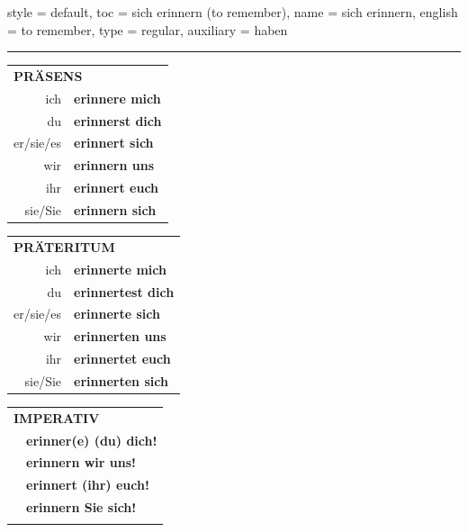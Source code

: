 \begin{verbentry}{
  style = {default},
  toc = {sich erinnern (to remember)},
  name = {sich erinnern},
  english = {to remember},
  type = {regular},
  auxiliary = {haben}
}
 
    
       \vspace{5pt}

    \hrule
    
    \vspace{5pt}

  \begin{tabular}{rl}
     \multicolumn{2}{l}{\textbf{PRÄSENS} }\\
    ich & \textbf{erinnere mich}\\
    du & \textbf{erinnerst dich}\\
    er/sie/es & \textbf{erinnert sich}\\
    wir & \textbf{erinnern uns}\\
    ihr & \textbf{erinnert euch}\\
    sie/Sie & \textbf{erinnern sich}\\
  \end{tabular}
  \hfill
     \begin{tabular}{rl}
    \multicolumn{2}{l}{\textbf{PRÄTERITUM} }\\
    ich & \textbf{erinnerte mich}\\
    du & \textbf{erinnertest dich}\\
    er/sie/es & \textbf{erinnerte sich}\\
    wir & \textbf{erinnerten uns}\\
    ihr & \textbf{erinnertet euch}\\
    sie/Sie & \textbf{erinnerten sich}\\
  \end{tabular}
  \hfill
  \begin{tabular}{rl}
     \multicolumn{2}{l}{\textbf{IMPERATIV} }\\
   & \textbf{erinner(e) (du) dich!}\\
   & \textbf{erinnern wir uns!}\\
   & \textbf{erinnert (ihr) euch!}\\
   & \textbf{erinnern Sie sich!}\\
   & \vspace{10pt}
  \end{tabular}

    \vspace{10pt}


\end{verbentry}
